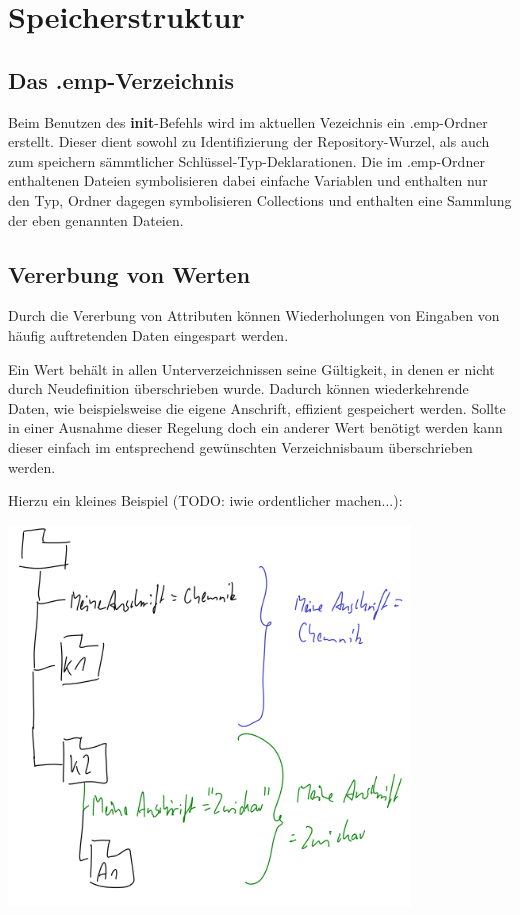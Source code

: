
\section{Speicherstruktur}

\subsection{Das .emp-Verzeichnis}
Beim Benutzen des \textbf{init}-Befehls wird im aktuellen Vezeichnis ein .emp-Ordner erstellt. Dieser dient sowohl zu Identifizierung der Repository-Wurzel, als auch zum speichern sämmtlicher Schlüssel-Typ-Deklarationen.
Die im .emp-Ordner enthaltenen Dateien symbolisieren dabei einfache Variablen und enthalten nur den Typ, Ordner dagegen symbolisieren Collections und enthalten eine Sammlung der eben genannten Dateien.

\subsection{Vererbung von Werten}
Durch die Vererbung von Attributen können Wiederholungen von Eingaben von häufig auftretenden Daten eingespart werden.

Ein Wert behält in allen Unterverzeichnissen seine Gültigkeit, in denen er nicht durch Neudefinition überschrieben wurde. Dadurch können wiederkehrende Daten, wie beispielsweise die eigene Anschrift, effizient gespeichert werden. Sollte in einer Ausnahme dieser Regelung doch ein anderer Wert benötigt werden kann dieser einfach im entsprechend gewünschten Verzeichnisbaum überschrieben werden.

Hierzu ein kleines Beispiel (TODO: iwie ordentlicher machen...):


\includegraphics[width=0.8\textwidth]{04-ordnerstruct.png}

